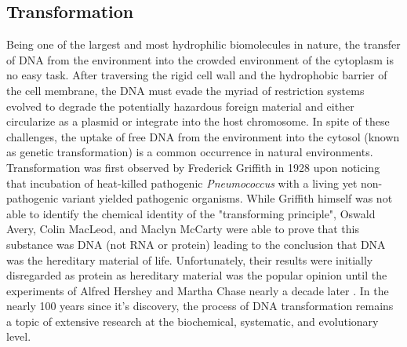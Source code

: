 \subsection*{Transformation}
Being one of the largest and most hydrophilic biomolecules in nature, the
transfer of DNA from the environment into the crowded environment of the
cytoplasm is no easy task. After traversing the rigid cell wall and the
hydrophobic barrier of the cell membrane, the DNA must evade the myriad of
restriction systems evolved to degrade the potentially hazardous foreign
material and either circularize as a plasmid or integrate into the host
chromosome. In spite of these challenges, the uptake of free DNA from the
environment into the cytosol (known as genetic transformation) is a common
occurrence in natural environments. Transformation was first observed by
Frederick Griffith in 1928\cite{Griffith:1928vg} upon noticing that incubation
of heat-killed pathogenic \textit{Pneumococcus} with a living yet non-pathogenic
variant yielded pathogenic organisms. While  Griffith himself was not able to
identify the chemical identity of the "transforming principle", Oswald Avery,
Colin MacLeod, and Maclyn McCarty were able to prove that this substance was DNA
(not RNA or protein)\cite{Avery:2014wx} leading to the conclusion that DNA was
the hereditary material of life. Unfortunately, their results were initially
disregarded as protein as hereditary material was the popular opinion until the
experiments of Alfred Hershey and Martha Chase nearly a decade later
\cite{Hershey:1952}. In the nearly 100 years since it's discovery, the process
of DNA transformation remains a topic of extensive research at the biochemical,
systematic, and evolutionary level.


